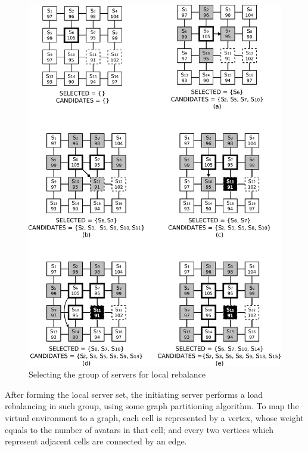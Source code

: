 \begin{figure}
 \centering
 \includegraphics[width=1.04\textwidth]{images/localselection}
 \caption{Selecting the group of servers for local rebalance}
 \label{fig:lee2}
\end{figure}

After forming the local server set, the initiating server performs a load rebalancing in such group, using some graph partitioning algorithm. To map the virtual environment to a graph, each cell is represented by a vertex, whose weight equals to the number of avatars in that cell; and every two vertices which represent adjacent cells are connected by an edge. %

